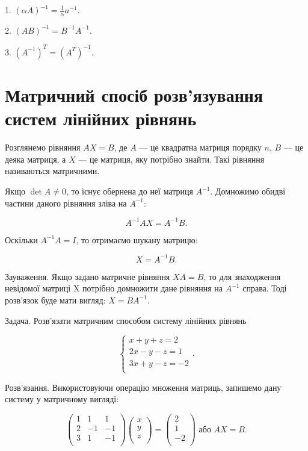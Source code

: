 1. $(\alpha A)^{-1} = \frac{1}{\alpha} a^{-1}$.

2. $(AB)^{-1} = B^{-1} A^{-1}$.

3. $(A^{-1})^T = (A^T)^{-1}$.

\section{Матричний спосіб розв’язування систем лінійних рівнянь}

Розглянемо рівняння $A X = B$, де $A$ --- це квадратна матриця порядку $n$, $B$ ---
це деяка матриця, а $X$ --- це матриця, яку потрібно знайти. Такі рівняння
називаються матричними.

Якщо $\det A \neq 0$, то існує обернена до неї матриця $A^{-1}$. Домножимо обидві
частини даного рівняння зліва на $A^{-1}$:

$$A^{-1} A X = A^{-1} B.$$

Оскільки $A^{-1} A = I$, то отримаємо шукану матрицю:

$$X = A^{-1} B.$$

Зауваження. Якщо задано матричне рівняння $X A = B$, то для знаходження
невідомої матриці X потрібно домножити дане рівняння на $A^{-1}$ справа. Тоді
розв’язок буде мати вигляд: $ X = B A^{-1}$.


Задача. Розв’язати матричним способом систему лінійних рівнянь

$$\left\{ \begin{matrix}
	x + y + z = 2 \\
	2x - y - z = 1 \\
	3x + y - z = -2 \\
\end{matrix} \right..$$

Розв’язання. Використовуючи операцію множення матриць, запишемо дану
систему у матричному вигляді:

$$\begin{pmatrix}
	1 & 1  & 1  \\
	2 & -1 & -1 \\
	3 & 1  & -1 \\
\end{pmatrix} \begin{pmatrix}
	x \\
	y \\
	z \\
\end{pmatrix}
= \begin{pmatrix}
	2 \\
	1 \\
	-2 \\
\end{pmatrix} \text{ або } AX = B.$$


